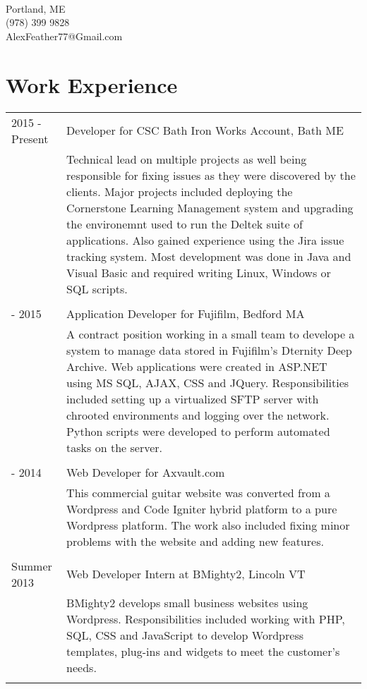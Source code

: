 \documentclass[10pt]{article}
\begin{document}
\pagestyle{empty}
\selectfont

{\\
Portland, ME\\(978) 399 9828\\AlexFeather77@Gmail.com\\}

\section*{\selectfont Work Experience}
\begin{tabular}{p{2.1cm}|p{14.9cm}}
	2015 - Present & Developer for CSC Bath Iron Works Account, Bath ME\\&\footnotesize{Technical lead on multiple projects as well being responsible for fixing issues as they were discovered by the clients. Major projects included deploying the Cornerstone Learning Management system and upgrading the environemnt used to run the Deltek suite of applications. Also gained experience using the Jira issue tracking system. Most development was done in Java and Visual Basic and required writing Linux, Windows or SQL scripts.}\\\multicolumn{2}{c}{} \\
	\centering 2014 - 2015 & Application Developer for Fujifilm, Bedford MA\\&\footnotesize{A contract position working in a small team to develope a system to manage data stored in Fujifilm's Dternity Deep Archive. Web applications were created in ASP.NET using MS SQL, AJAX, CSS and JQuery. Responsibilities included setting up a virtualized SFTP server with chrooted environments and logging over the network. Python scripts were developed to perform automated tasks on the server.}\\\multicolumn{2}{c}{} \\
	\centering 2013 - 2014 & Web Developer for Axvault.com\\&\footnotesize{This commercial guitar website was converted from a Wordpress and Code Igniter hybrid platform to a pure Wordpress platform. The work also included fixing minor problems with the website and adding new features.}\\\multicolumn{2}{c}{} \\
	\centering Summer 2013 & Web Developer Intern at BMighty2, Lincoln VT\\&\footnotesize{BMighty2 develops small business websites using Wordpress. Responsibilities included working with PHP, SQL, CSS and JavaScript to develop Wordpress templates, plug-ins and widgets to meet the customer's needs.}\\\multicolumn{2}{c}{} \\
\end{tabular}
\end{document}
